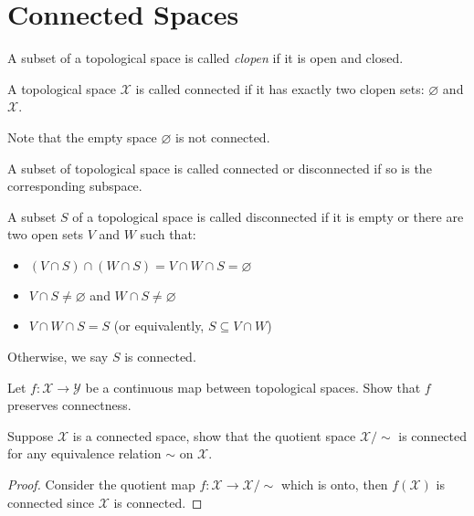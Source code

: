 \documentclass[./main.tex]{subfiles}
\begin{document}
\section{Connected Spaces}

\begin{definition}
  A subset of a topological space is called \textit{clopen} if it is
  open and closed.
\end{definition}

\begin{definition}
  A topological space $\mathcal{X}$ is called connected
  if it has exactly two clopen sets: $\varnothing$ and $\mathcal{X}$.
\end{definition}

Note that the empty space $\varnothing$ is not connected.

A subset of topological space is called connected or disconnected
if so is the corresponding subspace.

\begin{definition}
  A subset $S$ of a topological space is called disconnected
  if it is empty or there are two open sets $V$ and $W$ such that:
  \begin{itemize}
    \item $(V \cap S) \cap (W \cap S) = V \cap W \cap S = \varnothing$
    \item $V \cap S \neq \varnothing$ and $W \cap S \neq \varnothing$
    \item $V \cap W \cap S = S$ (or equivalently, $S \subseteq V \cap W$)
  \end{itemize}

  Otherwise, we say $S$ is connected.
\end{definition}

\begin{theorem}
  Let $f : \mathcal{X} \rightarrow \mathcal{Y}$ be a continuous map
  between topological spaces. Show that $f$ preserves connectness.
\end{theorem}

\begin{theorem}
  Suppose $\mathcal{X}$ is a connected space, show that the quotient space $\mathcal{X}/\sim$
  is connected for any equivalence relation $\sim$ on $\mathcal{X}$.
\end{theorem}
\begin{proof}
  Consider the quotient map $f : \mathcal{X} \rightarrow \mathcal{X}/\sim$ which is onto,
  then $f(\mathcal{X})$ is connected since $\mathcal{X}$ is connected.
\end{proof}
\end{document}
